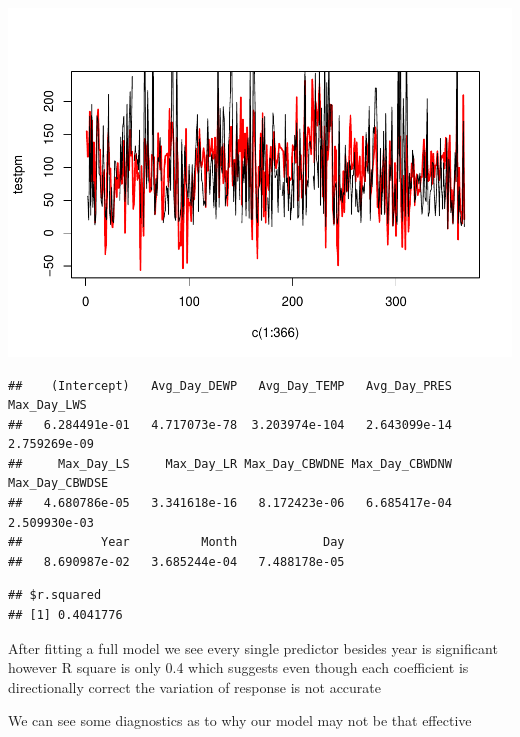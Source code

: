 \documentclass[
]{article}
\newenvironment{Shaded}{\begin{snugshade}}{\end{snugshade}}
\newcommand{\AttributeTok}[1]{\textcolor[rgb]{0.77,0.63,0.00}{#1}}
\newcommand{\CommentTok}[1]{\textcolor[rgb]{0.56,0.35,0.01}{\textit{#1}}}
\newcommand{\DecValTok}[1]{\textcolor[rgb]{0.00,0.00,0.81}{#1}}
\newcommand{\FunctionTok}[1]{\textcolor[rgb]{0.00,0.00,0.00}{#1}}
\newcommand{\NormalTok}[1]{#1}
\newcommand{\OtherTok}[1]{\textcolor[rgb]{0.56,0.35,0.01}{#1}}
\newcommand{\SpecialCharTok}[1]{\textcolor[rgb]{0.00,0.00,0.00}{#1}}
\begin{document}
\includegraphics{Final_Project_2_files/figure-latex/unnamed-chunk-8-1.pdf}

\begin{verbatim}
##    (Intercept)   Avg_Day_DEWP   Avg_Day_TEMP   Avg_Day_PRES    Max_Day_LWS 
##   6.284491e-01   4.717073e-78  3.203974e-104   2.643099e-14   2.759269e-09 
##     Max_Day_LS     Max_Day_LR Max_Day_CBWDNE Max_Day_CBWDNW Max_Day_CBWDSE 
##   4.680786e-05   3.341618e-16   8.172423e-06   6.685417e-04   2.509930e-03 
##           Year          Month            Day 
##   8.690987e-02   3.685244e-04   7.488178e-05
\end{verbatim}

\begin{verbatim}
## $r.squared
## [1] 0.4041776
\end{verbatim}

After fitting a full model we see every single predictor besides year is
significant however R square is only 0.4 which suggests even though each
coefficient is directionally correct the variation of response is not
accurate

We can see some diagnostics as to why our model may not be that
effective

\begin{Shaded}
\end{Shaded}
\end{document}
